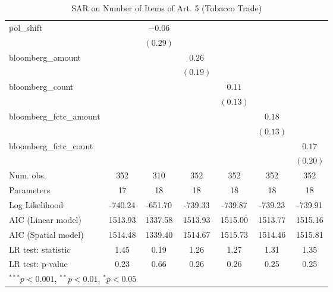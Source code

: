 \begin{table}[!h]
\begin{center}
\begin{tabular}{l c c c c c c }
pol\_shift              &              & $-0.06$      &              &              &              &              \\
                        &              & $(0.29)$     &              &              &              &              \\
bloomberg\_amount       &              &              & $0.26$       &              &              &              \\
                        &              &              & $(0.19)$     &              &              &              \\
bloomberg\_count        &              &              &              & $0.11$       &              &              \\
                        &              &              &              & $(0.13)$     &              &              \\
bloomberg\_fctc\_amount &              &              &              &              & $0.18$       &              \\
                        &              &              &              &              & $(0.13)$     &              \\
bloomberg\_fctc\_count  &              &              &              &              &              & $0.17$       \\
                        &              &              &              &              &              & $(0.20)$     \\
\midrule
Num. obs.               & 352          & 310          & 352          & 352          & 352          & 352          \\
Parameters              & 17           & 18           & 18           & 18           & 18           & 18           \\
Log Likelihood          & -740.24      & -651.70      & -739.33      & -739.87      & -739.23      & -739.91      \\
AIC (Linear model)      & 1513.93      & 1337.58      & 1513.93      & 1515.00      & 1513.77      & 1515.16      \\
AIC (Spatial model)     & 1514.48      & 1339.40      & 1514.67      & 1515.73      & 1514.46      & 1515.81      \\
LR test: statistic      & 1.45         & 0.19         & 1.26         & 1.27         & 1.31         & 1.35         \\
LR test: p-value        & 0.23         & 0.66         & 0.26         & 0.26         & 0.25         & 0.25         \\
\bottomrule
\multicolumn{7}{l}{\scriptsize{$^{***}p<0.001$, $^{**}p<0.01$, $^*p<0.05$}}
\end{tabular}
\caption{SAR on Number of Items of Art. 5 (Tobacco Trade)}
\label{table:coefficients}
\end{center}
\end{table}
